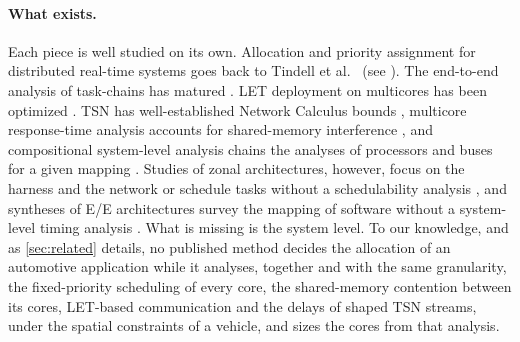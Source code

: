 \paragraph{What exists.} Each piece is well studied on its own.
Allocation and priority assignment for distributed real-time systems goes
back to Tindell et al.~\cite{tindell1992allocating} (see
\cite{zhu2012optimization,davis2011survey,davis2016review}). The
end-to-end analysis of task-chains has matured \cite{becker2017end,
durr2019end,gunzel2021timing,martinez2018analytical}. LET deployment on
multicores has been optimized \cite{biondi2018achieving,
pazzaglia2019optimizing,paladino2024optimizing}. TSN has well-established
Network Calculus bounds \cite{azua2014complete,mohammadpour2018latency,
zhao2021latency,zhao2018worst,leboudec2018theory}, multicore
response-time analysis accounts for shared-memory interference
\cite{davis2018extensible}, and compositional system-level analysis
chains the analyses of processors and buses for a given mapping
\cite{henia2005system}. Studies of zonal
architectures, however, focus on the harness and the network
\cite{park2024zonal} or schedule tasks without a schedulability analysis
\cite{aghababaiyan2025deterministic}, and syntheses of E/E architectures
survey the mapping of software without a system-level timing analysis
\cite{askaripoor2022synthesis}.
What is missing is the system level. To our knowledge, and as
\cref{sec:related} details, no published method decides the allocation of
an automotive application while it analyses, together and with the same
granularity, the fixed-priority scheduling of every core, the
shared-memory contention between its cores, LET-based communication and the
delays of shaped TSN streams, under the spatial constraints of a vehicle,
and sizes the cores from that analysis.

